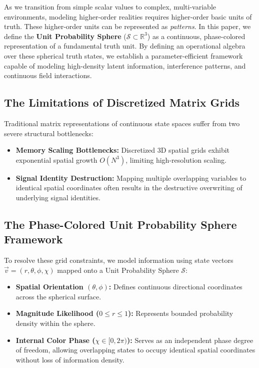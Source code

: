 \documentclass[12pt, a4paper]{article}
\begin{document}
As we transition from simple scalar values to complex, multi-variable environments, modeling higher-order realities requires higher-order basic units of truth. These higher-order units can be represented as \textit{patterns}. In this paper, we define the \textbf{Unit Probability Sphere} ($\mathcal{S} \subset \mathbb{R}^3$) as a continuous, phase-colored representation of a fundamental truth unit. By defining an operational algebra over these spherical truth states, we establish a parameter-efficient framework capable of modeling high-density latent information, interference patterns, and continuous field interactions.

\subsection{The Limitations of Discretized Matrix Grids}
Traditional matrix representations of continuous state spaces suffer from two severe structural bottlenecks:
\begin{itemize}
    \item \textbf{Memory Scaling Bottlenecks:} Discretized 3D spatial grids exhibit exponential spatial growth $O(N^3)$, limiting high-resolution scaling.
    \item \textbf{Signal Identity Destruction:} Mapping multiple overlapping variables to identical spatial coordinates often results in the destructive overwriting of underlying signal identities.
\end{itemize}

\subsection{The Phase-Colored Unit Probability Sphere Framework}
To resolve these grid constraints, we model information using state vectors $\vec{v} = (r, \theta, \phi, \chi)$ mapped onto a Unit Probability Sphere $\mathcal{S}$:
\begin{itemize}
    \item \textbf{Spatial Orientation $(\theta, \phi)$:} Defines continuous directional coordinates across the spherical surface.
    \item \textbf{Magnitude Likelihood ($0 \leq r \leq 1$):} Represents bounded probability density within the sphere.
    \item \textbf{Internal Color Phase ($\chi \in [0, 2\pi)$):} Serves as an independent phase degree of freedom, allowing overlapping states to occupy identical spatial coordinates without loss of information density.
\end{itemize}
\end{document}
